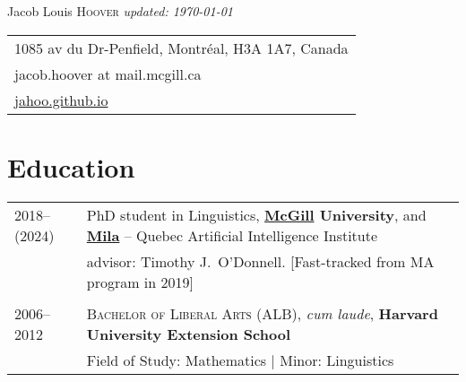 \documentclass[11pt,a4paper]{article}
\begin{document}
\pagestyle{empty}
\Huge{Jacob Louis \scshape{Hoover}}
\small\textit{\hfill updated: \today}

\begin{tabular}{l}
    	1085 av du Dr-Penfield, Montréal, H3A 1A7, Canada \\
    	jacob.hoover at mail.mcgill.ca\\
    	\href{http://jahoo.github.io}{jahoo.github.io}
\end{tabular}
\vspace*{10pt}

\section{Education} 

\begin{longtable}{p{2cm}|p{14.5cm}}
2018--(2024)	&PhD student in Linguistics, 
\textbf{\href{https://www.mcgill.ca/linguistics/graduate}{McGill} University}, and
\href{http://mila.quebec}{\textbf{Mila}} -- Quebec Artificial Intelligence Institute \\
& advisor: Timothy J.\ O'Donnell. [Fast-tracked from MA program in 2019] \\

\multicolumn{2}{c}{}\\
2006--2012		& \textsc{Bachelor of Liberal Arts (ALB)}, \emph{cum laude}, \textbf{Harvard University Extension School}\\
				&  Field of Study: Mathematics | Minor: Linguistics  \\%
\end{longtable}
\end{document}
